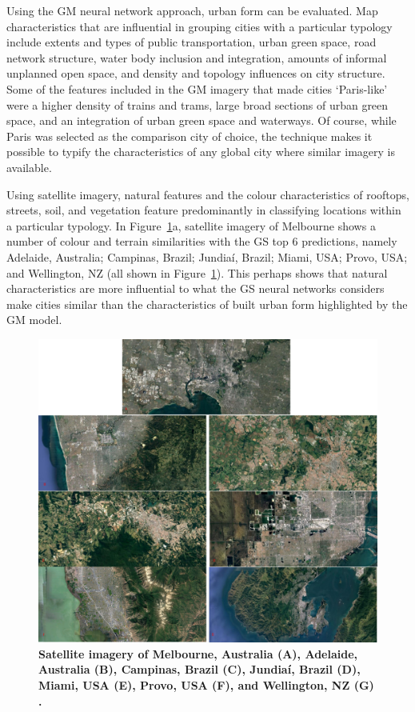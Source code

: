 \documentclass[Crown,sageh,times]{sagej}
\begin{document}
Using the GM neural network approach, urban form can be evaluated. Map characteristics that are influential in grouping cities with a particular typology include extents and types of public transportation, urban green space, road network structure, water body inclusion and integration, amounts of informal unplanned open space, and density and topology influences on city structure. Some of the features included in the GM imagery that made cities `Paris-like' were a higher density of trains and trams, large broad sections of urban green space, and an integration of urban green space and waterways. Of course, while Paris was selected as the comparison city of choice, the technique makes it possible to typify the characteristics of any global city where similar imagery is available.

Using satellite imagery, natural features and the colour characteristics of rooftops, streets, soil, and vegetation feature predominantly in classifying locations within a particular typology. In Figure~\ref{fig:satimages}a, satellite imagery of Melbourne shows a number of colour and terrain similarities with the GS top 6 predictions, namely Adelaide, Australia; Campinas, Brazil; Jundia\'{i}, Brazil; Miami, USA; Provo, USA; and Wellington, NZ (all shown in Figure~\ref{fig:satimages}). This perhaps shows that natural characteristics are more influential to what the GS neural networks considers make cities similar than the characteristics of built urban form highlighted by the GM model.

\begin{figure}[!htbp]
\centering    
\includegraphics[scale=0.35]{Images/PlosOne/Fig14.png} 
 \caption{\bf Satellite imagery of Melbourne, Australia (A), Adelaide, Australia (B), Campinas, Brazil (C), Jundia\'{i}, Brazil (D), Miami, USA (E), Provo, USA (F), and Wellington, NZ (G) \citep{GoogleStatic2017}.}    
 \label{fig:satimages}  
\end{figure} 
\end{document}
